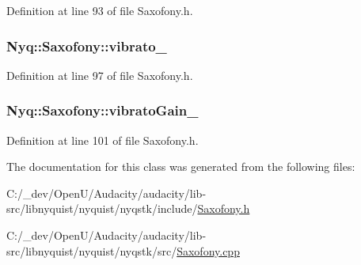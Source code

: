 Definition at line 93 of file Saxofony.\+h.

\subsubsection[{\texorpdfstring{vibrato\+\_\+}{vibrato_}}]{ Nyq\+::\+Saxofony\+::vibrato\+\_\+\hspace{0.3cm}{\ttfamily [protected]}}\hypertarget{class_nyq_1_1_saxofony_a370943ad93126d91ef7e5c108b8a09bb}{}\label{class_nyq_1_1_saxofony_a370943ad93126d91ef7e5c108b8a09bb}


Definition at line 97 of file Saxofony.\+h.

\subsubsection[{\texorpdfstring{vibrato\+Gain\+\_\+}{vibratoGain_}}]{ Nyq\+::\+Saxofony\+::vibrato\+Gain\+\_\+\hspace{0.3cm}{\ttfamily [protected]}}\hypertarget{class_nyq_1_1_saxofony_a64b9bde97127b3de724ad9c2e18f33ff}{}\label{class_nyq_1_1_saxofony_a64b9bde97127b3de724ad9c2e18f33ff}


Definition at line 101 of file Saxofony.\+h.



The documentation for this class was generated from the following files\+:\begin{DoxyCompactItemize}
\item 
C\+:/\+\_\+dev/\+Open\+U/\+Audacity/audacity/lib-\/src/libnyquist/nyquist/nyqstk/include/\hyperlink{_saxofony_8h}{Saxofony.\+h}\item 
C\+:/\+\_\+dev/\+Open\+U/\+Audacity/audacity/lib-\/src/libnyquist/nyquist/nyqstk/src/\hyperlink{_saxofony_8cpp}{Saxofony.\+cpp}\end{DoxyCompactItemize}
